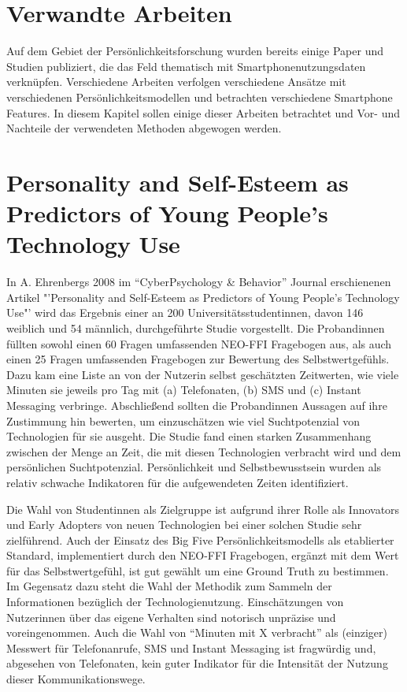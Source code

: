 \section{Verwandte Arbeiten}
\label{ch:Grundlagen:sec:RelatedWork}

Auf dem Gebiet der Persönlichkeitsforschung wurden bereits einige Paper und Studien publiziert,
die das Feld thematisch mit Smartphonenutzungsdaten verknüpfen. 
Verschiedene Arbeiten verfolgen verschiedene Ansätze mit verschiedenen Persönlichkeitsmodellen und betrachten verschiedene Smartphone Features.
In diesem Kapitel sollen einige dieser Arbeiten betrachtet und Vor- und Nachteile der verwendeten Methoden abgewogen werden.

\section*{Personality and Self-Esteem as Predictors of Young People’s Technology Use}

In A. Ehrenbergs 2008 im "`CyberPsychology \& Behavior"' Journal erschienenen Artikel "'Personality and Self-Esteem as Predictors of Young People’s Technology Use"' \cite{ehrenberg2008personality}
wird das Ergebnis einer an 200 Universitätsstudentinnen, davon 146 weiblich und 54  männlich, durchgeführte Studie vorgestellt.
Die Probandinnen füllten sowohl einen 60 Fragen umfassenden NEO-FFI Fragebogen aus, als auch einen 25 Fragen umfassenden Fragebogen zur Bewertung des Selbstwertgefühls.
Dazu kam eine Liste an von der Nutzerin selbst geschätzten Zeitwerten, wie viele Minuten sie jeweils pro Tag mit (a) Telefonaten, (b) SMS und (c) Instant Messaging verbringe.
Abschließend sollten die Probandinnen Aussagen auf ihre Zustimmung hin bewerten, um einzuschätzen wie viel Suchtpotenzial von Technologien für sie ausgeht.
Die Studie fand einen starken Zusammenhang zwischen der Menge an Zeit, die mit diesen Technologien verbracht wird und dem persönlichen Suchtpotenzial.
Persönlichkeit und Selbstbewusstsein wurden als relativ schwache Indikatoren für die aufgewendeten Zeiten identifiziert.
\par
Die Wahl von Studentinnen als Zielgruppe ist aufgrund ihrer Rolle als Innovators und Early Adopters von neuen Technologien bei einer solchen Studie sehr zielführend.
Auch der Einsatz des Big Five Persönlichkeitsmodells als etablierter Standard, implementiert durch den NEO-FFI Fragebogen, ergänzt mit dem Wert für das Selbstwertgefühl, ist gut gewählt um eine Ground Truth zu bestimmen.
Im Gegensatz dazu steht die Wahl der Methodik zum Sammeln der Informationen bezüglich der Technologienutzung.
Einschätzungen von Nutzerinnen über das eigene Verhalten sind notorisch unpräzise und voreingenommen.
Auch die Wahl von "`Minuten mit X verbracht"' als (einziger) Messwert für Telefonanrufe, SMS und Instant Messaging ist fragwürdig und, abgesehen von Telefonaten, kein guter Indikator für die Intensität der Nutzung dieser Kommunikationswege.


